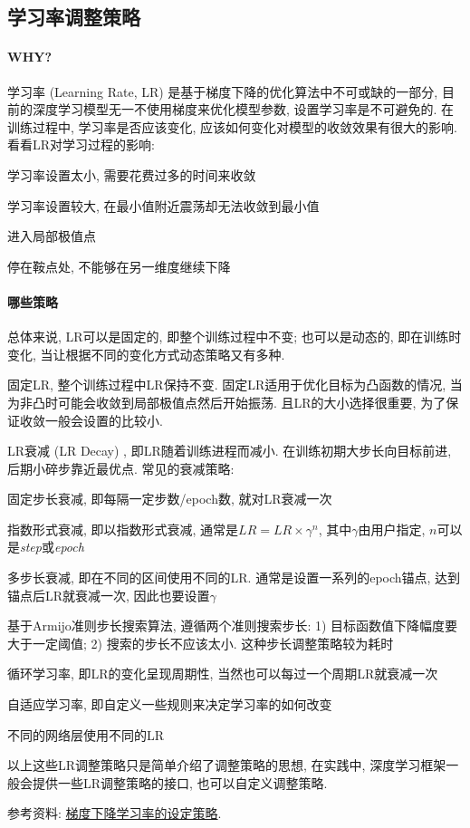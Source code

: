 \subsection{学习率调整策略}
\paragraph{WHY?}学习率 (Learning Rate, LR) 是基于梯度下降的优化算法中不可或缺的一部分, 目前的深度学习模型无一不使用梯度来优化模型参数, 设置学习率是不可避免的. 在训练过程中, 学习率是否应该变化, 应该如何变化对模型的收敛效果有很大的影响. 看看LR对学习过程的影响: 
\begin{myitemize}
	\item 学习率设置太小, 需要花费过多的时间来收敛
	\item 学习率设置较大, 在最小值附近震荡却无法收敛到最小值
	\item 进入局部极值点
	\item 停在鞍点处, 不能够在另一维度继续下降
\end{myitemize}

\paragraph{哪些策略}总体来说, LR可以是固定的, 即整个训练过程中不变; 也可以是动态的, 即在训练时变化, 当让根据不同的变化方式动态策略又有多种. 
\begin{myitemize}
	\item 固定LR, 整个训练过程中LR保持不变. 固定LR适用于优化目标为凸函数的情况, 当为非凸时可能会收敛到局部极值点然后开始振荡. 且LR的大小选择很重要, 为了保证收敛一般会设置的比较小. 
	\item LR衰减 (LR Decay) , 即LR随着训练进程而减小. 在训练初期大步长向目标前进, 后期小碎步靠近最优点. 常见的衰减策略: 
	\begin{myitemize}
		\item 固定步长衰减, 即每隔一定步数/epoch数, 就对LR衰减一次
		\item 指数形式衰减, 即以指数形式衰减, 通常是$LR = LR \times \gamma^{n}$, 其中$\gamma$由用户指定, $n$可以是\textit{step}或\textit{epoch}
		\item 多步长衰减, 即在不同的区间使用不同的LR. 通常是设置一系列的epoch锚点, 达到锚点后LR就衰减一次, 因此也要设置$\gamma$
	\end{myitemize}
	\item 基于Armijo准则步长搜索算法, 遵循两个准则搜索步长: 1) 目标函数值下降幅度要大于一定阈值; 2) 搜索的步长不应该太小. 这种步长调整策略较为耗时
	\item 循环学习率, 即LR的变化呈现周期性, 当然也可以每过一个周期LR就衰减一次
	\item 自适应学习率, 即自定义一些规则来决定学习率的如何改变
	\item 不同的网络层使用不同的LR
\end{myitemize}
以上这些LR调整策略只是简单介绍了调整策略的思想, 在实践中, 深度学习框架一般会提供一些LR调整策略的接口, 也可以自定义调整策略. 

参考资料: \href{https://lumingdong.cn/setting-strategy-of-gradient-descent-learning-rate.html}{梯度下降学习率的设定策略}. 